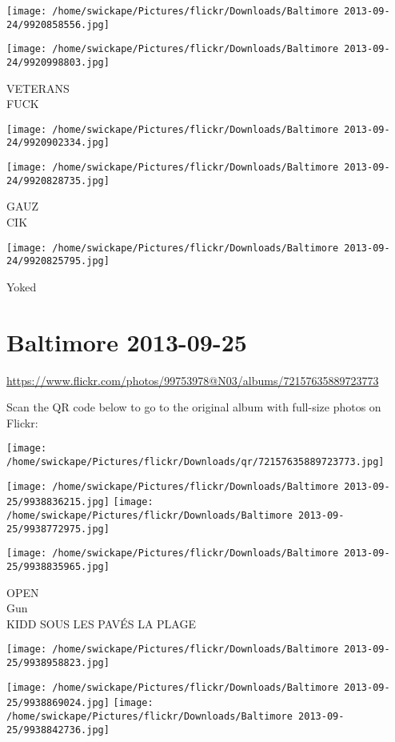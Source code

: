 \documentclass[10pt,letterpaper]{article}
\begin{document}
\texttt{[image: /home/swickape/Pictures/flickr/Downloads/Baltimore 2013-09-24/9920858556.jpg]}

\vspace{0.25in}
\texttt{[image: /home/swickape/Pictures/flickr/Downloads/Baltimore 2013-09-24/9920998803.jpg]}

VETERANS\\
FUCK
\pagebreak

\texttt{[image: /home/swickape/Pictures/flickr/Downloads/Baltimore 2013-09-24/9920902334.jpg]}

\vspace{0.25in}
\texttt{[image: /home/swickape/Pictures/flickr/Downloads/Baltimore 2013-09-24/9920828735.jpg]}

GAUZ\\
CIK
\pagebreak

\texttt{[image: /home/swickape/Pictures/flickr/Downloads/Baltimore 2013-09-24/9920825795.jpg]}

Yoked
\pagebreak

\section*{Baltimore 2013-09-25}

\url{https://www.flickr.com/photos/99753978@N03/albums/72157635889723773}

Scan the QR code below to go to the original album with full-size photos on Flickr:

\texttt{[image: /home/swickape/Pictures/flickr/Downloads/qr/72157635889723773.jpg]}
\pagebreak

\texttt{[image: /home/swickape/Pictures/flickr/Downloads/Baltimore 2013-09-25/9938836215.jpg]}
\texttt{[image: /home/swickape/Pictures/flickr/Downloads/Baltimore 2013-09-25/9938772975.jpg]}

\vspace{0.25in}
\texttt{[image: /home/swickape/Pictures/flickr/Downloads/Baltimore 2013-09-25/9938835965.jpg]}

OPEN\\
Gun\\
KIDD SOUS LES PAVÉS LA PLAGE
\pagebreak

\texttt{[image: /home/swickape/Pictures/flickr/Downloads/Baltimore 2013-09-25/9938958823.jpg]}

\vspace{0.25in}
\texttt{[image: /home/swickape/Pictures/flickr/Downloads/Baltimore 2013-09-25/9938869024.jpg]}
\texttt{[image: /home/swickape/Pictures/flickr/Downloads/Baltimore 2013-09-25/9938842736.jpg]}
\end{document}
